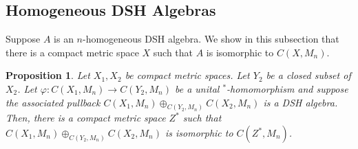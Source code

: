 \documentclass[12pt]{amsart}
\numberwithin{equation}{section}
\newtheorem{proposition}[theorem]{Proposition}
\theoremstyle{definition}
\theoremstyle{remark}
\begin{document}
\subsection{Homogeneous DSH Algebras}
\label{sub: hom}

Suppose $A$ is an $n$-homogeneous DSH algebra. We show in this subsection that there is a compact metric space $X$ such that $A$ is isomorphic to $C(X,M_{n})$.

\begin{proposition}
	\label{homcomb}
	Let $X_{1},X_{2}$ be compact metric spaces. Let $Y_{2}$ be a closed subset of $X_{2}$. Let $\varphi\colon C(X_{1},M_{n})\to C(Y_{2},M_{n})$ be a unital $^*$-homomorphism and suppose the associated pullback $C(X_{1},M_{n})\oplus_{C(Y_{2},M_{n})}C(X_{2},M_{n})$ is a DSH algebra. Then, there is a compact metric space $Z^{*}$ such that
	$C(X_{1},M_{n})\oplus_{C(Y_{2},M_{n})}C(X_{2},M_{n})$ is isomorphic to $C(Z^{*},M_{n})$.
\end{proposition}
\end{document}
